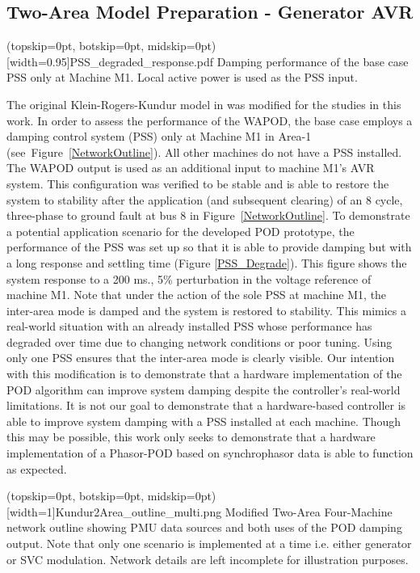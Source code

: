 \documentclass{ieeeaccess}
\begin{document}
\subsection{Two-Area Model Preparation - Generator AVR}

\Figure[tbp](topskip=0pt, botskip=0pt, midskip=0pt)[width=0.95\columnwidth]{PSS_degraded_response.pdf}
{Damping performance of the base case PSS only at Machine M1. Local active power is used as the PSS input.\label{PSS_Degrade}}

The original Klein-Rogers-Kundur model in \cite{KundurTwoArea} was modified for the studies in this work. In order to assess the performance of the WAPOD, the base case employs a damping control system (PSS) only at Machine M1 in Area-1 (see~Figure~\ref{NetworkOutline}). All other machines do not have a PSS installed. The WAPOD output is used as an additional input to machine M1\rq{s} AVR system. This configuration was  verified to be stable and is able to restore the system to stability after the application (and subsequent clearing) of an 8 cycle, three-phase to ground fault at bus 8 in Figure~\ref{NetworkOutline}. To demonstrate a potential application scenario for the developed POD prototype, the performance of the PSS was set up so that it is able to provide damping but with a long response and settling time (Figure \ref{PSS_Degrade}). This figure shows the system response to a 200 ms., 5\% perturbation in the voltage reference of machine M1. Note that under the action of the sole PSS at machine M1, the inter-area mode is damped and the system is restored to stability. This mimics a real-world situation with an already installed PSS whose performance has degraded over time due to changing network conditions or poor tuning. Using only one PSS ensures that the inter-area mode is clearly visible. Our intention with this modification is to demonstrate that a hardware implementation of the POD algorithm can improve system damping despite the controller\rq{s} real-world limitations. It is not our goal to demonstrate that a hardware-based controller is able to improve system damping with a PSS installed at each machine. Though this may be possible, this work only seeks to demonstrate that a hardware implementation of a Phasor-POD based on synchrophasor data is able to function as expected.

\Figure[tbp!](topskip=0pt, botskip=0pt, midskip=0pt)[width=1\textwidth]{Kundur2Area_outline_multi.png}
{Modified Two-Area Four-Machine network outline showing PMU data sources and both uses of the POD damping output. Note that only one scenario is implemented at a time i.e. either generator or SVC modulation. Network details are left incomplete for illustration purposes.\label{NetworkOutline}}
\end{document}
